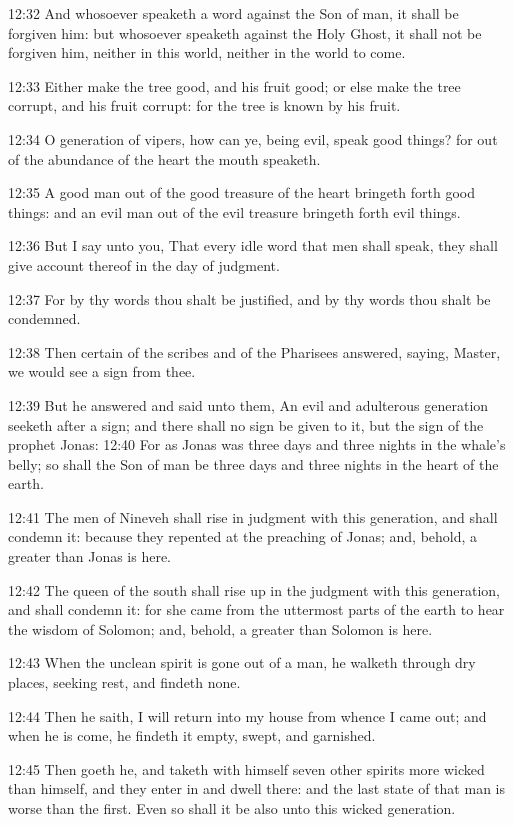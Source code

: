 12:32 And whosoever speaketh a word against the Son of man, it shall
be forgiven him: but whosoever speaketh against the Holy Ghost, it
shall not be forgiven him, neither in this world, neither in the world
to come.

12:33 Either make the tree good, and his fruit good; or else make the
tree corrupt, and his fruit corrupt: for the tree is known by his
fruit.

12:34 O generation of vipers, how can ye, being evil, speak good
things?  for out of the abundance of the heart the mouth speaketh.

12:35 A good man out of the good treasure of the heart bringeth forth
good things: and an evil man out of the evil treasure bringeth forth
evil things.

12:36 But I say unto you, That every idle word that men shall speak,
they shall give account thereof in the day of judgment.

12:37 For by thy words thou shalt be justified, and by thy words thou
shalt be condemned.

12:38 Then certain of the scribes and of the Pharisees answered,
saying, Master, we would see a sign from thee.

12:39 But he answered and said unto them, An evil and adulterous
generation seeketh after a sign; and there shall no sign be given to
it, but the sign of the prophet Jonas: 12:40 For as Jonas was three
days and three nights in the whale's belly; so shall the Son of man be
three days and three nights in the heart of the earth.

12:41 The men of Nineveh shall rise in judgment with this generation,
and shall condemn it: because they repented at the preaching of Jonas;
and, behold, a greater than Jonas is here.

12:42 The queen of the south shall rise up in the judgment with this
generation, and shall condemn it: for she came from the uttermost
parts of the earth to hear the wisdom of Solomon; and, behold, a
greater than Solomon is here.

12:43 When the unclean spirit is gone out of a man, he walketh through
dry places, seeking rest, and findeth none.

12:44 Then he saith, I will return into my house from whence I came
out; and when he is come, he findeth it empty, swept, and garnished.

12:45 Then goeth he, and taketh with himself seven other spirits more
wicked than himself, and they enter in and dwell there: and the last
state of that man is worse than the first. Even so shall it be also
unto this wicked generation.

